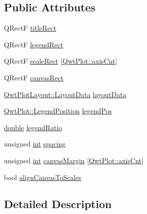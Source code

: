 \subsection*{Public Attributes}
\begin{DoxyCompactItemize}
\item 
Q\-Rect\-F \hyperlink{class_qwt_plot_layout_1_1_private_data_ab74a819b13e480044627527c27473006}{title\-Rect}
\item 
Q\-Rect\-F \hyperlink{class_qwt_plot_layout_1_1_private_data_a3f2fbd12df85461b12846b62357b239e}{legend\-Rect}
\item 
Q\-Rect\-F \hyperlink{class_qwt_plot_layout_1_1_private_data_a0f7fb5ef75cba603288d09e6174759a4}{scale\-Rect} \mbox{[}\hyperlink{class_qwt_plot_a81df699dcf9dde0752c0726b5f31e271aea62036dfd48ee0f9450718592614892}{Qwt\-Plot\-::axis\-Cnt}\mbox{]}
\item 
Q\-Rect\-F \hyperlink{class_qwt_plot_layout_1_1_private_data_a8000e73823398884b71c159c56c08cf0}{canvas\-Rect}
\item 
\hyperlink{class_qwt_plot_layout_1_1_layout_data}{Qwt\-Plot\-Layout\-::\-Layout\-Data} \hyperlink{class_qwt_plot_layout_1_1_private_data_a75b20a0499afd289035cfc0bdf73bf85}{layout\-Data}
\item 
\hyperlink{class_qwt_plot_a31aacb65b5c049dde8c34a0d8482661b}{Qwt\-Plot\-::\-Legend\-Position} \hyperlink{class_qwt_plot_layout_1_1_private_data_a7491407e8f2b7c402c1d8b2f1c10403b}{legend\-Pos}
\item 
\hyperlink{_super_l_u_support_8h_a8956b2b9f49bf918deed98379d159ca7}{double} \hyperlink{class_qwt_plot_layout_1_1_private_data_ac846f78297e9809786508adefec77b7b}{legend\-Ratio}
\item 
unsigned \hyperlink{ioapi_8h_a787fa3cf048117ba7123753c1e74fcd6}{int} \hyperlink{class_qwt_plot_layout_1_1_private_data_a5892e92d2d8cd8819f158b677ac4a792}{spacing}
\item 
unsigned \hyperlink{ioapi_8h_a787fa3cf048117ba7123753c1e74fcd6}{int} \hyperlink{class_qwt_plot_layout_1_1_private_data_a23da6384d6dc24dfe01b6ad39b0253b5}{canvas\-Margin} \mbox{[}\hyperlink{class_qwt_plot_a81df699dcf9dde0752c0726b5f31e271aea62036dfd48ee0f9450718592614892}{Qwt\-Plot\-::axis\-Cnt}\mbox{]}
\item 
bool \hyperlink{class_qwt_plot_layout_1_1_private_data_a1613af8cad56eb3a00ecabbdc085c392}{align\-Canvas\-To\-Scales}
\end{DoxyCompactItemize}


\subsection{Detailed Description}


